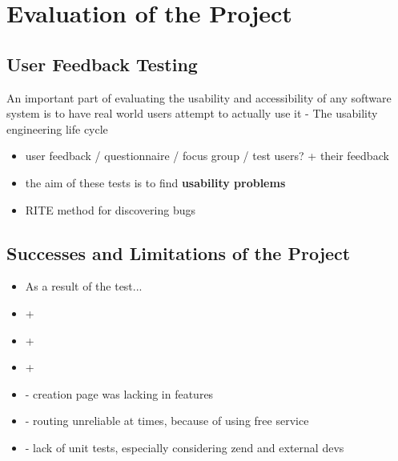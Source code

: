 \section{Evaluation of the Project}

\subsection{User Feedback Testing}
An important part of evaluating the usability and accessibility of any software system is
to have real world users attempt to actually use it - The usability engineering life cycle \cite{nielsen1992usability}
{\color{red}
	\begin{itemize}
		\item user feedback / questionnaire / focus group / test users? + their feedback
		\item the aim of these tests is to find \textbf{usability problems}
		\item RITE method for discovering bugs
	\end{itemize}
}

\subsection{Successes and Limitations of the Project}
{\color{red}
	\begin{itemize}
		\item As a result of the test...
		\item +
		\item +
		\item +
		\item - creation page was lacking in features
		\item - routing unreliable at times, because of using free service
		\item - lack of unit tests, especially considering zend and external devs
	\end{itemize}
}
